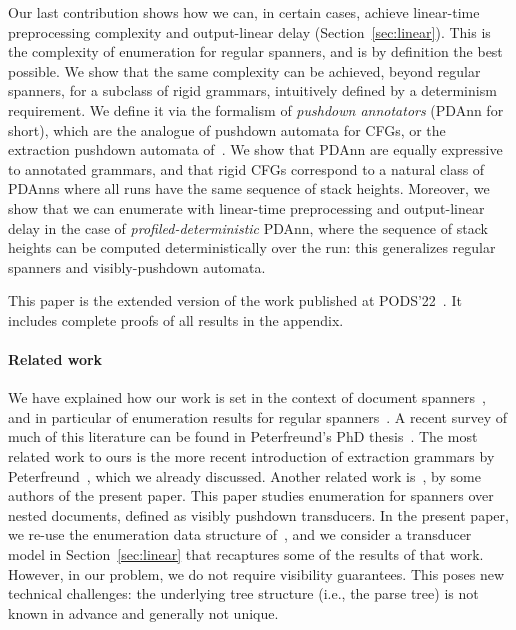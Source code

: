     Our last contribution shows how we can, in certain cases, achieve linear-time preprocessing complexity and output-linear delay (Section~\ref{sec:linear}). This is the complexity of enumeration for regular spanners, and is by definition the best possible. We show that the same complexity can be achieved, beyond regular spanners, for a subclass of rigid grammars, intuitively defined by a determinism requirement. We define it via the formalism of \emph{pushdown annotators} (PDAnn for short), which are the analogue of pushdown automata for CFGs, or the extraction pushdown automata of~\cite{Peterfreund21}. We show that PDAnn are equally expressive to annotated grammars, and that rigid CFGs correspond to a natural class of PDAnns where all runs have the same sequence of stack heights. Moreover, 
    we show that we can enumerate with linear-time preprocessing and output-linear delay in the case of \emph{profiled-deterministic} PDAnn, where the sequence of stack heights can be computed deterministically over the run: this generalizes regular spanners and visibly-pushdown automata.

    This paper is the extended version of the work published at
    PODS'22~\cite{amarilli2022efficientPODS}. It includes complete proofs of
    all results in the appendix.

\paragraph{Related work}
We have explained how our work is set in the context of document spanners~\cite{FaginKRV15}, and in particular of enumeration results for regular spanners~\cite{FlorenzanoRUVV18,amarilli2019constant}. A recent survey of much of this literature can be found in Peterfreund's PhD thesis~\cite{peterfreund2019complexity}. The most related work to ours is the more recent introduction of extraction grammars by Peterfreund~\cite{Peterfreund21}, which we already discussed.
Another related work is~\cite{icdt2020nested}, by some authors of the present
paper. This paper studies enumeration for spanners over nested documents,
defined as visibly pushdown transducers. In the present paper, we re-use the
enumeration data structure of~\cite{icdt2020nested}, and we consider a transducer model in
Section~\ref{sec:linear} that recaptures some of the results of that work. However, in our
problem, we do not require visibility guarantees. This poses new technical
challenges: the underlying tree structure (i.e., the parse tree) is not known in
advance and generally not unique.
%

